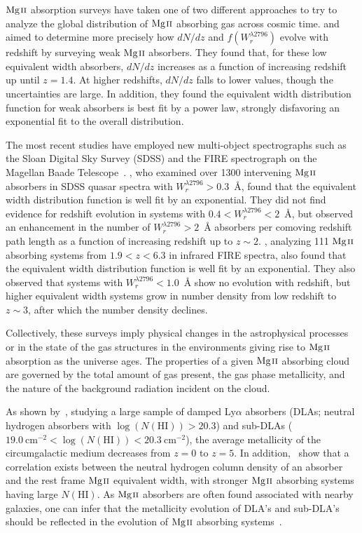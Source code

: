 \documentclass[iop,apj,numberedappendix,appendixfloats,twocolappendix]{emulateapj}
\begin{document}
${\hbox{{\rm Mg}\kern 0.1em{\sc ii}}}$ absorption surveys have taken one of two different approaches to try to analyze the global distribution of ${\hbox{{\rm Mg}\kern 0.1em{\sc ii}}}$ absorbing gas across cosmic time. \cite{Churchill1999} and \cite{Narayanan2007} aimed to determine more precisely how $dN\!/dz$ and $f(W_r^{\lambda2796})$ evolve with redshift by surveying weak ${\hbox{{\rm Mg}\kern 0.1em{\sc ii}}}$ absorbers. They found that, for these low equivalent width absorbers, $dN\!/dz$ increases as a function of increasing redshift up until $z = 1.4$. At higher redshifts, $dN\!/dz$ falls to lower values, though the uncertainties are large. In addition, they found the equivalent width distribution function for weak absorbers is best fit by a power law, strongly disfavoring an exponential fit to the overall distribution. 

The most recent studies have employed new multi-object spectrographs such as the Sloan Digital Sky Survey (SDSS) and the FIRE spectrograph on the Magellan Baade Telescope~\citep{Nestor2005,Matejek2012}. \cite{Nestor2005}, who examined over 1300 intervening ${\hbox{{\rm Mg}\kern 0.1em{\sc ii}}}$ absorbers in SDSS quasar spectra with $W_r^{\lambda2796} > 0.3$~{\AA}, found that the equivalent width distribution function is well fit by an exponential. They did not find evidence for redshift evolution in systems with $0.4 < W_r^{\lambda2796} < 2$~{\AA}, but observed an enhancement in the number of $W_r^{\lambda2796} > 2$~{\AA} absorbers per comoving redshift path length as a function of increasing redshift up to $z \sim 2$. \cite{Matejek2012}, analyzing 111 ${\hbox{{\rm Mg}\kern 0.1em{\sc ii}}}$ absorbing systems from $1.9 < z < 6.3$ in infrared FIRE spectra, also found that the equivalent width distribution function is well fit by an exponential. They also observed that systems with $W_r^{\lambda2796} < 1.0$~{\AA} show no evolution with redshift, but higher equivalent width systems grow in number density from low redshift to $z \sim 3$, after which the number density declines.

Collectively, these surveys imply physical changes in the astrophysical processes or in the state of the gas structures in the environments giving rise to ${\hbox{{\rm Mg}\kern 0.1em{\sc ii}}}$ absorption as the universe ages. The properties of a given ${\hbox{{\rm Mg}\kern 0.1em{\sc ii}}}$ absorbing cloud are governed by the total amount of gas present, the gas phase metallicity, and the nature of the background radiation incident on the cloud.

As shown by~\cite{Quiret2016}, studying a large sample of damped Ly$\alpha$ absorbers (DLAs; neutral hydrogen absorbers with $\log(N(\mathrm{HI})) > 20.3$) and sub-DLAs ($19.0~\mathrm{cm^{-2}} < \log(N(\mathrm{HI})) < 20.3~\mathrm{cm^{-2}}$), the average metallicity of the circumgalactic medium decreases from $z = 0$ to $z = 5$. In addition,~\cite{Menard2009} show that a correlation exists between the neutral hydrogen column density of an absorber and the rest frame ${\hbox{{\rm Mg}\kern 0.1em{\sc ii}}}$ equivalent width, with stronger ${\hbox{{\rm Mg}\kern 0.1em{\sc ii}}}$ absorbing systems having large $N(\mathrm{HI})$. As ${\hbox{{\rm Mg}\kern 0.1em{\sc ii}}}$ absorbers are often found associated with nearby galaxies, one can infer that the metallicity evolution of DLA's and sub-DLA's should be reflected in the evolution of ${\hbox{{\rm Mg}\kern 0.1em{\sc ii}}}$ absorbing systems~\citep{Kulkarni2002,Prochaska2003,Kulkarni2005,Kulkarni2007}. 
\end{document}
